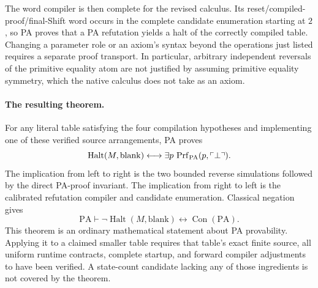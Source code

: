 The word compiler is then complete for the revised calculus.  Its
reset/compiled-proof/final-Shift word occurs in the complete candidate
enumeration starting at $2$, so PA proves that a PA refutation yields
a halt of the correctly compiled table.  Changing a parameter role
or an axiom's syntax beyond the operations just listed requires a
separate proof transport.  In particular, arbitrary independent
reversals of the primitive equality atom are not justified by assuming
primitive equality symmetry, which the native calculus does not take
as an axiom.

\paragraph{The resulting theorem.}
For any literal table satisfying the four compilation hypotheses and
implementing one of these verified source arrangements, PA proves
\[
 \operatorname{Halt}(M,\mathrm{blank})
   \longleftrightarrow
 \exists p\,\operatorname{Prf}_{\rm PA}(p,\ulcorner\bot\urcorner).
\]
The implication from left to right is the two bounded reverse simulations
followed by the direct PA-proof invariant.  The implication from right
to left is the calibrated refutation compiler and candidate enumeration.
Classical negation gives
\[
 \boxed{\quad
 \mathrm{PA}\vdash
 \neg\operatorname{Halt}(M,\mathrm{blank})
       \longleftrightarrow\operatorname{Con}(\mathrm{PA}).\quad}
\]
This theorem is an ordinary mathematical statement about PA provability.
Applying it to a claimed smaller table requires that table's exact
finite source, all uniform runtime contracts, complete startup, and
forward compiler adjustments to have been verified.  A state-count
candidate lacking any of those ingredients is not covered by the theorem.
